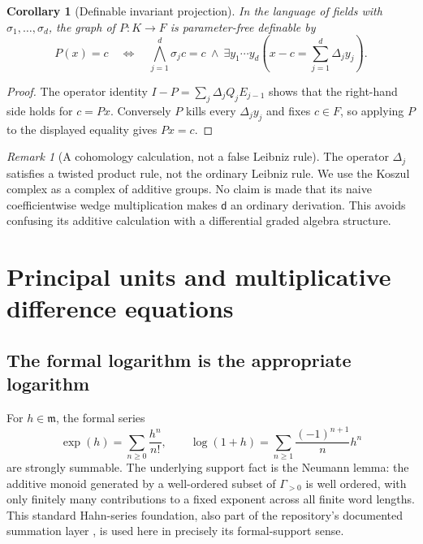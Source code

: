 \documentclass[11pt,oneside]{article}
\numberwithin{equation}{section}
\newtheorem{corollary}[theorem]{Corollary}
\theoremstyle{definition}
\theoremstyle{remark}
\newtheorem{remark}[theorem]{Remark}
\newcommand{\mm}{\mathfrak m}
\newcommand{\dd}{\mathsf d}
\begin{document}
\begin{corollary}[Definable invariant projection]\label{dsup:cor:defproj}
In the language of fields with $\sigma_1,\ldots,\sigma_d$, the graph of
$P:K\to F$ is parameter-free definable by
\begin{equation}\label{dsup:eq:defproj}
 P(x)=c\quad\Longleftrightarrow\quad
 \bigwedge_{j=1}^d\sigma_jc=c
 \ \land\ 
 \exists y_1\cdots y_d\left(x-c=\sum_{j=1}^d\Delta_jy_j\right).
\end{equation}
\end{corollary}
\begin{proof}
The operator identity
$I-P=\sum_j\Delta_jQ_jE_{j-1}$ shows that the right-hand side holds for
$c=Px$. Conversely $P$ kills every $\Delta_jy_j$ and fixes $c\in F$, so
applying $P$ to the displayed equality gives $Px=c$.
\end{proof}

\begin{remark}[A cohomology calculation, not a false Leibniz rule]
The operator $\Delta_j$ satisfies a twisted product rule, not the ordinary
Leibniz rule. We use the Koszul complex as a complex of additive groups.
No claim is made that its naive coefficientwise wedge multiplication
makes $\dd$ an ordinary derivation. This avoids confusing its additive
calculation with a differential graded algebra structure.
\end{remark}

\section{Principal units and multiplicative difference equations}\label{dsup:sec:multiplicative}

\subsection{The formal logarithm is the appropriate logarithm}

For $h\in\mm$, the formal series
\begin{equation}\label{dsup:eq:explog}
 \exp(h)=\sum_{n\ge0}\frac{h^n}{n!},\qquad
 \log(1+h)=\sum_{n\ge1}\frac{(-1)^{n+1}}n h^n
\end{equation}
are strongly summable. The underlying support fact is the Neumann lemma:
the additive monoid generated by a well-ordered subset of $\Gamma_{>0}$
is well ordered, with only finitely many contributions to a fixed
exponent across all finite word lengths. This standard Hahn-series
foundation, also part of the repository's documented summation layer
\cite{Repo}, is used here in precisely its formal-support sense.
\end{document}
